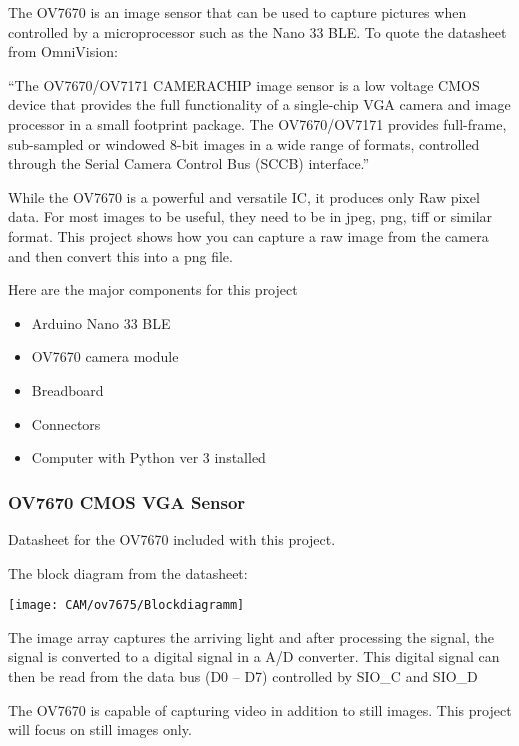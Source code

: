 \bigskip

The OV7670 is an image sensor that can be used to capture pictures when controlled by a microprocessor such as the Nano 33 BLE. To quote the datasheet from OmniVision:

“The OV7670/OV7171 CAMERACHIP image sensor is a low voltage CMOS device that provides the full functionality of a single-chip VGA camera and image processor in a small footprint package. The OV7670/OV7171 provides full-frame, sub-sampled or windowed 8-bit images in a wide range of formats, controlled through the Serial Camera Control Bus (SCCB) interface.”

While the OV7670 is a powerful and versatile IC, it produces only Raw pixel data. For most images to be useful, they need to be in jpeg, png, tiff or similar format. This project shows how you can capture a raw image from the camera and then convert this into a png file.

Here are the major components for this project


\begin{itemize}
  \item Arduino Nano 33 BLE
  \item OV7670 camera module
  \item Breadboard
  \item Connectors
  \item Computer with Python ver 3 installed
  
\end{itemize}

\subsubsection{OV7670 CMOS VGA Sensor}

Datasheet for the OV7670 included with this project.

The block diagram from the datasheet:

\begin{center}
  \texttt{[image: CAM/ov7675/Blockdiagramm]}
\end{center}

The image array captures the arriving light and after processing the signal, the signal is converted to a digital signal in a A/D converter. This digital signal can then be read from the data bus (D0 – D7) controlled by SIO\_C and SIO\_D

The OV7670 is capable of capturing video in addition to still images. This project will focus on still images only.


